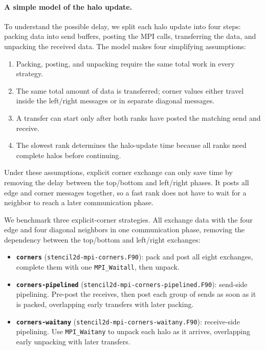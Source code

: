 \documentclass{article}
\begin{document}
\paragraph{A simple model of the halo update.}
To understand the possible delay, we split each halo update into four
steps: packing data into send buffers, posting the MPI calls, transferring
the data, and unpacking the received data. The model makes four simplifying
assumptions:

\begin{enumerate}
    \item Packing, posting, and unpacking require the same total work in
    every strategy.
    \item The same total amount of data is transferred; corner values
    either travel inside the left/right messages or in separate diagonal
    messages.
    \item A transfer can start only after both ranks have posted the
    matching send and receive.
    \item The slowest rank determines the halo-update time because all
    ranks need complete halos before continuing.
\end{enumerate}

Under these assumptions, explicit corner exchange can only save time by
removing the delay between the top/bottom and left/right phases. It posts
all edge and corner messages together, so a fast rank does not have to
wait for a neighbor to reach a later communication phase.

We benchmark three explicit-corner strategies. All exchange data with
the four edge and four diagonal neighbors in one communication phase,
removing the dependency between the top/bottom and left/right exchanges:

\begin{itemize}
    \item \textbf{\texttt{corners}}
    (\texttt{stencil2d-mpi-corners.F90}): pack and post all eight
    exchanges, complete them with one \texttt{MPI\_Waitall}, then unpack.
    \item \textbf{\texttt{corners-pipelined}}
    (\texttt{stencil2d-mpi-corners-pipelined.F90}): send-side
    pipelining. Pre-post the receives, then post each group of sends as
    soon as it is packed, overlapping early transfers with later packing.
    \item \textbf{\texttt{corners-waitany}}
    (\texttt{stencil2d-mpi-corners-waitany.F90}): receive-side
    pipelining. Use \texttt{MPI\_Waitany} to unpack each halo as it
    arrives, overlapping early unpacking with later transfers.
\end{itemize}
\end{document}
